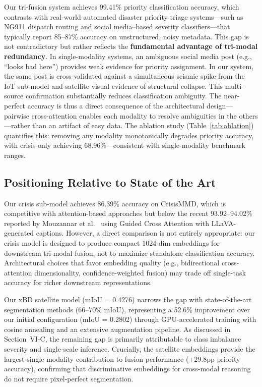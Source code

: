 \documentclass[journal]{IEEEtran}
\begin{document}
Our tri-fusion system achieves 99.41\% priority classification accuracy, which contrasts with real-world automated disaster priority triage systems---such as NG911 dispatch routing and social media--based severity classifiers---that typically report 85--87\% accuracy on unstructured, noisy metadata. This gap is not contradictory but rather reflects the \textbf{fundamental advantage of tri-modal redundancy}. In single-modality systems, an ambiguous social media post (e.g., ``looks bad here'') provides weak evidence for priority assignment. In our system, the same post is cross-validated against a simultaneous seismic spike from the IoT sub-model and satellite visual evidence of structural collapse. This multi-source confirmation substantially reduces classification ambiguity. The near-perfect accuracy is thus a direct consequence of the architectural design---pairwise cross-attention enables each modality to resolve ambiguities in the others---rather than an artifact of easy data. The ablation study (Table~\ref{tab:ablation}) quantifies this: removing any modality monotonically degrades priority accuracy, with crisis-only achieving 68.96\%---consistent with single-modality benchmark ranges.

\subsection{Positioning Relative to State of the Art}

Our crisis sub-model achieves 86.39\% accuracy on CrisisMMD, which is competitive with attention-based approaches but below the recent 93.92--94.02\% reported by Mouzannar et al.~\cite{mouzannar2025guidedcross} using Guided Cross Attention with LLaVA-generated captions. However, a direct comparison is not entirely appropriate: our crisis model is designed to produce compact 1024-dim embeddings for downstream tri-modal fusion, not to maximize standalone classification accuracy. Architectural choices that favor embedding quality (e.g., bidirectional cross-attention dimensionality, confidence-weighted fusion) may trade off single-task accuracy for richer downstream representations.

Our xBD satellite model (mIoU = 0.4276) narrows the gap with state-of-the-art segmentation methods (66--70\% mIoU), representing a 52.6\% improvement over our initial configuration (mIoU = 0.2802) through GPU-accelerated training with cosine annealing and an extensive augmentation pipeline. As discussed in Section~VI-C, the remaining gap is primarily attributable to class imbalance severity and single-scale inference. Crucially, the satellite embeddings provide the largest single-modality contribution to fusion performance (+29.8pp priority accuracy), confirming that discriminative embeddings for cross-modal reasoning do not require pixel-perfect segmentation.
\end{document}
